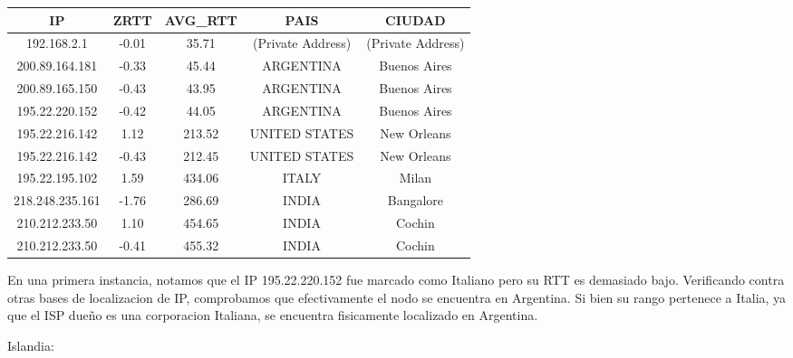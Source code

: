 \begin{tabular}{|c@{\hspace{5ex}}c@{\hspace{5ex}}c@{\hspace{5ex}}c@{\hspace{5ex}}c|}
 \hline
 \rule{0pt}{1.2em}IP & ZRTT & AVG\_RTT & PAIS & CIUDAD\\[0.2em]
 \hline

\rule{0pt}{1.2em} 192.168.2.1  &  -0.01 & 35.71 & (Private Address) & (Private Address) \\[0.2em]
\rule{0pt}{1.2em} 200.89.164.181  &  -0.33 & 45.44 & ARGENTINA & Buenos Aires \\[0.2em]
\rule{0pt}{1.2em} 200.89.165.150  &  -0.43 & 43.95 & ARGENTINA & Buenos Aires \\[0.2em]
\rule{0pt}{1.2em} 195.22.220.152  &  -0.42 & 44.05 & ARGENTINA & Buenos Aires \\[0.2em]
\rule{0pt}{1.2em} 195.22.216.142  &  1.12 & 213.52 & UNITED STATES & New Orleans \\[0.2em]
\rule{0pt}{1.2em} 195.22.216.142  &  -0.43 & 212.45 & UNITED STATES & New Orleans \\[0.2em]
\rule{0pt}{1.2em} 195.22.195.102  &  1.59 & 434.06 & ITALY & Milan \\[0.2em]
\rule{0pt}{1.2em} 218.248.235.161  &  -1.76 & 286.69 & INDIA & Bangalore \\[0.2em]
\rule{0pt}{1.2em} 210.212.233.50  &  1.10 & 454.65 & INDIA & Cochin \\[0.2em]
\rule{0pt}{1.2em} 210.212.233.50  &  -0.41 & 455.32 & INDIA & Cochin \\[0.2em]
\hline
 \end{tabular}

 En una primera instancia, notamos que el IP 195.22.220.152 fue marcado como Italiano pero su RTT es demasiado bajo. Verificando contra otras bases de localizacion de IP, comprobamos que efectivamente el nodo se encuentra en Argentina. Si bien su rango pertenece a Italia, ya que el ISP dueño es una corporacion Italiana, se encuentra fisicamente localizado en Argentina.

Islandia:

